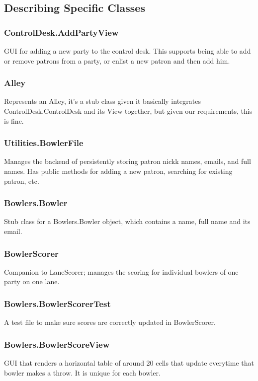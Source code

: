 \subsection{Describing Specific Classes}

\subsubsection{ControlDesk.AddPartyView}
GUI for adding a new party to the control desk. This supports being able to add or remove patrons from a party, or enlist a new patron and then add him.

\subsubsection{Alley}
Represents an Alley, it's a stub class given it basically integrates ControlDesk.ControlDesk and its View together, but given our requirements, this is fine.

\subsubsection{Utilities.BowlerFile}
Manages the backend of persistently storing patron nickk names, emails, and full names. Has public methods for adding a new patron, searching for existing patron, etc.

\subsubsection{Bowlers.Bowler}
Stub class for a Bowlers.Bowler object, which contains a name, full name and its email.

\subsubsection{BowlerScorer}
Companion to LaneScorer; manages the scoring for individual bowlers of one party on one lane.

\subsubsection{Bowlers.BowlerScorerTest}
A test file to make sure scores are correctly updated in BowlerScorer.

\subsubsection{Bowlers.BowlerScoreView}
GUI that renders a horizontal table of around 20 cells that update everytime that bowler makes a throw. It is unique for each bowler.
